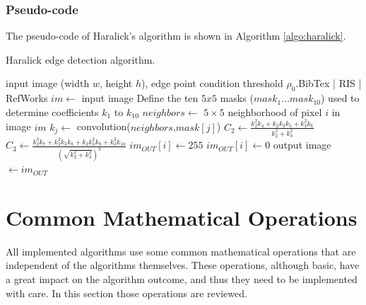 \documentclass{ipol}
\numberwithin{equation}{section}
\numberwithin{table}{section}
\begin{document}
{\subsubsection{Pseudo-code}

The pseudo-code of Haralick's algorithm is shown in Algorithm \ref{algo:haralick}.

\begin{algorithm}[t]
\caption{Haralick edge detection algorithm.}
\label{algo:haralick}
\begin{algorithmic}[1]
\REQUIRE input image (width $w$, height $h$), edge point condition threshold $\rho_0$.BibTex | RIS | RefWorks
\STATE $im \leftarrow$ input image
\STATE Define the ten $5x5$ masks ($mask_1\dots mask_{10}$) used to determine coefficients $k_1$ to $k_{10}$ 
	\STATE $neighbors \leftarrow$ $5\times5$ neighborhood of pixel $i$ in image $im$
		\STATE $k_j \leftarrow$ convolution($neighbors$,$mask[j]$)
	\ENDFOR
	\STATE $C_2 \leftarrow \frac{k_2^2k_4 + k_2k_3k_5 + k_3^2k_6}{k_2^2 + k_3^2}$
	\STATE $C_3 \leftarrow \frac{k_2^3k_7 + k_2^2k_3k_8 + k_2k_3^2k_9 + k_3^3k_{10}}{(\sqrt{k_2^2 + k_3^2})^3}$
		\STATE $im_{OUT}[i] \leftarrow 255$
	\ELSE
		\STATE $im_{OUT}[i] \leftarrow 0$
	\ENDIF
\ENDFOR
\RETURN output image $\leftarrow im_{OUT}$
\end{algorithmic}
\end{algorithm}


\section{Common Mathematical Operations}
\label{sec:appendix1}

\myn{\label{}} All implemented algorithms use some common mathematical operations that are independent of the algorithms themselves. 
These operations, although basic, have a great impact on the algorithm outcome, and thus they need to be 
implemented with care. In this section those operations are reviewed.



}
\end{document}
